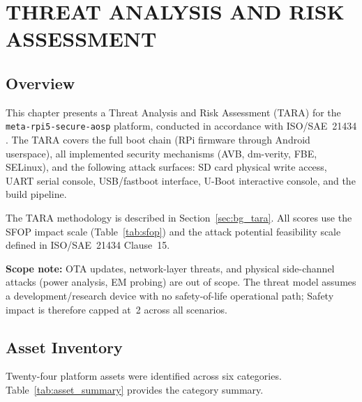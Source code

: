 \chapter{THREAT ANALYSIS AND RISK ASSESSMENT}
\label{ch:tara}

\section{Overview}

This chapter presents a Threat Analysis and Risk Assessment (TARA) for the \texttt{meta-rpi5-secure-aosp} platform, conducted in accordance with ISO/SAE~21434 \cite{iso_sae_21434}. The TARA covers the full boot chain (RPi firmware through Android userspace), all implemented security mechanisms (AVB, dm-verity, FBE, SELinux), and the following attack surfaces: SD card physical write access, UART serial console, USB/fastboot interface, U-Boot interactive console, and the build pipeline.

The TARA methodology is described in Section~\ref{sec:bg_tara}. All scores use the SFOP impact scale (Table~\ref{tab:sfop}) and the attack potential feasibility scale defined in ISO/SAE~21434 Clause~15.

\textbf{Scope note:} OTA updates, network-layer threats, and physical side-channel attacks (power analysis, EM probing) are out of scope. The threat model assumes a development/research device with no safety-of-life operational path; Safety impact is therefore capped at~2 across all scenarios.

\section{Asset Inventory}
\label{sec:tara_assets}

Twenty-four platform assets were identified across six categories.
Table~\ref{tab:asset_summary} provides the category summary.

